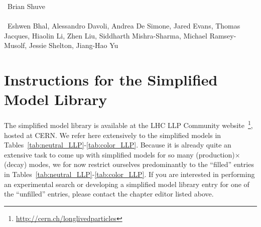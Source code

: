 ~Brian Shuve \\
\text{ \; }\\
~Eshwen Bhal, Alessandro Davoli, Andrea De Simone, Jared Evans, Thomas Jacques, Hiaolin Li, Zhen Liu, Siddharth Mishra-Sharma, Michael Ramsey-Musolf, Jessie Shelton, Jiang-Hao Yu
\text{ \; }\\

\section{Instructions for the Simplified Model Library}

The simplified model library is available at the LHC LLP Community website~\footnote{\url{http://cern.ch/longlivedparticles}}, hosted at CERN. We refer here extensively to the simplified models in Tables~\ref{tab:neutral_LLP}-\ref{tab:color_LLP}. Because it is already quite an extensive task to come up with simplified models for so many (production)$\times$(decay) modes, we for now restrict ourselves predominantly to the ``filled'' entries in Tables~\ref{tab:neutral_LLP}-\ref{tab:color_LLP}. If you are interested in performing an experimental search or developing a simplified model library entry for one of the ``unfilled'' entries, please contact the chapter editor listed above.

